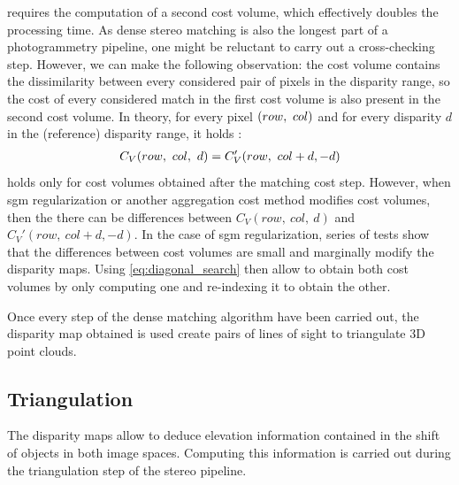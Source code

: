 \begin{remark}
      requires the computation of a second cost volume, which effectively doubles the processing time. As dense stereo matching is also the longest part of a photogrammetry pipeline, one might be reluctant to carry out a cross-checking step. However, we can make the following observation: the cost volume contains the dissimilarity between every considered pair of pixels in the disparity range, so the cost of every considered match in the first cost volume is also present in the second cost volume. In theory, for every pixel $(row, ~col)$ and for every disparity $d$ in the (reference) disparity range, it holds \cite{bebis_mutual_2008}:
     \begin{align}\label{eq:diagonal_search}
         C_V(row, ~col,~d) = C_V'(row, ~col+d, -d)
     \end{align}
      holds only for cost volumes obtained after the matching cost step. However, when \acrshort{sgm} regularization or another aggregation cost method modifies cost volumes, then the there can be differences between $C_V(row,~col,~d)$ and $C_V'(row,~col+d, -d)$. In the case of \acrshort{sgm} regularization, series of tests show that the differences between cost volumes are small and marginally modify the disparity maps. Using \eqref{eq:diagonal_search} then allow to obtain both cost volumes by only computing one and re-indexing it to obtain the other.
\end{remark}

Once every step of the dense matching algorithm have been carried out, the disparity map obtained is used create pairs of lines of sight to triangulate 3D point clouds.

\subsection{Triangulation}\label{sec:triangulation}
The disparity maps allow to deduce elevation information contained in the shift of objects in both image spaces. Computing this information is carried out during the triangulation step of the stereo pipeline.

